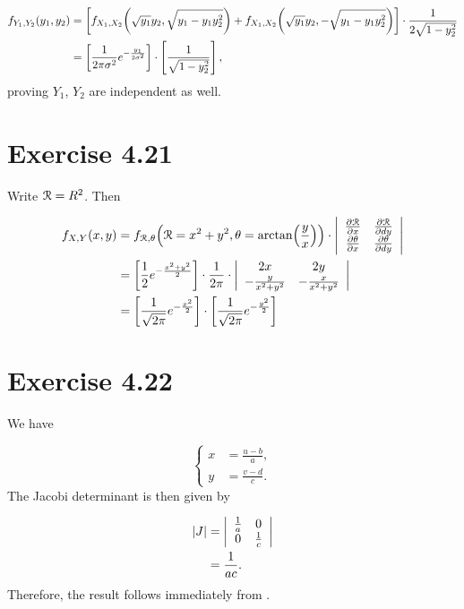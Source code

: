 \documentclass[12pt,letterpaper,reqno]{amsart}
\numberwithin{equation}{subsection}
\begin{document}
\begin{align*}
    {f_{Y_1, Y_2}}\! \left( {y_1, y_2} \right) &= \left[ {f_{X_1, X_2}}\! \left( {\sqrt{y_1}y_2, \sqrt{y_1 - y_1 y_2^2}} \right) + {f_{X_1, X_2}}\! \left( {\sqrt{y_1}y_2, -\sqrt{y_1 - y_1 y_2^2}} \right) \right] \cdot \frac{1}{2\sqrt{1 - y_2^2}} \\
    &= \left[ \frac{1}{2 \pi \sigma^2} e^{-\frac{y_1}{2\sigma^2}} \right] \cdot \left[ \frac{1}{\sqrt{1 - y_2^2}} \right],
\end{align*}
proving $Y_1$, $Y_2$ are independent as well.

\newpage
\section{Exercise 4.21}

Write $\mathcal{{R}} = R^2$. Then

\begin{align*}
    {f_{X, Y}}\! \left( {x,y} \right) &= {f_{\mathcal{{R}}, \theta}}\! \left( {\mathcal{{R}} = x^2 + y^2, \theta = {\arctan}\! \left( {\frac{y}{x}} \right)} \right) \cdot \left\vert \begin{array}{cc}
         \frac{\partial {\mathcal{{R}}}}{\partial {x}} & \frac{\partial {\mathcal{{R}}}}{\partial {dy}} \\
         \frac{\partial {\theta}}{\partial {x}} & \frac{\partial {\theta}}{\partial {dy}}
    \end{array} \right\vert \\
    &= \left[ \frac{1}{2}e^{-\frac{x^2 + y^2}{2}} \right] \cdot \frac{1}{2\pi} \cdot \left\vert \begin{array}{cc}
         2x & 2y \\
         -\frac{y}{x^2 + y^2} & -\frac{x}{x^2 + y^2} \\
    \end{array} \right\vert \\
    &= \left[ \frac{1}{\sqrt{2\pi}} e^{-\frac{x^2}{2}} \right] \cdot \left[ \frac{1}{\sqrt{2\pi}} e^{-\frac{y^2}{2}} \right]
\end{align*}

\newpage
\section{Exercise 4.22}

We have

\[ \left\{ \begin{array}{cc}
     x &= \frac{u-b}{a}, \\
     y &= \frac{v-d}{c}.
\end{array} \right. \]
The Jacobi determinant is then given by

\begin{align*}
    \left\lvert{J}\right\rvert &= \left\lvert{\begin{array}{cc}
         \frac{1}{a} & 0  \\
         0 & \frac{1}{c}
    \end{array}}\right\rvert \\
    &= \frac{1}{ac}.
\end{align*}
Therefore, the result follows immediately from \cite[page 158]{Berger-Casella}.
\end{document}
